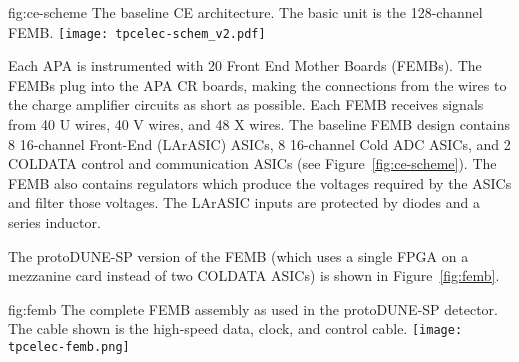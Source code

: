 
\begin{dunefigure}
{fig:ce-scheme}
{The baseline CE architecture. The basic unit is the 128-channel FEMB.}
\texttt{[image: tpcelec-schem\_v2.pdf]}
\end{dunefigure}

Each APA is instrumented with 20 Front End Mother Boards (FEMBs).
The FEMBs plug into the APA CR boards, making the connections from the wires to the charge amplifier circuits as short as possible.
Each FEMB receives signals from 40 U wires, 40 V wires, and 48 X wires.
The baseline FEMB design contains 8 16-channel Front-End (LArASIC) ASICs, 8 16-channel Cold ADC ASICs, and 2 COLDATA control and communication ASICs (see Figure~\ref{fig:ce-scheme}).
The FEMB also contains regulators which produce the voltages required by the ASICs and 
filter those voltages.
The LArASIC inputs are protected by diodes and a series inductor.
 
The protoDUNE-SP version of the FEMB (which uses a single FPGA on a mezzanine card instead of two COLDATA ASICs) is shown in Figure~\ref{fig:femb}.

\begin{dunefigure}
{fig:femb}
{The complete FEMB assembly as used in the protoDUNE-SP detector. The cable shown is the high-speed data, clock, and control cable.}
\texttt{[image: tpcelec-femb.png]}
\end{dunefigure}

